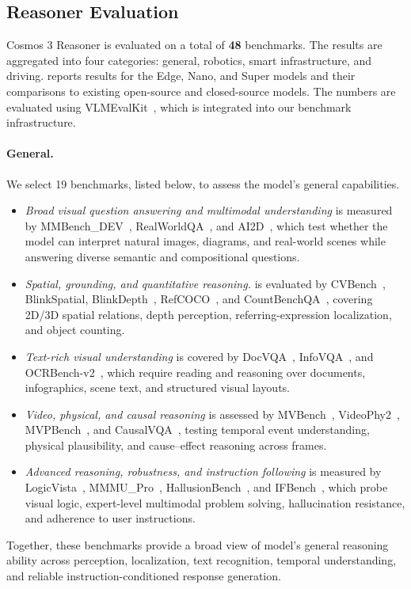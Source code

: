 \subsection{Reasoner Evaluation}



Cosmos 3 Reasoner is evaluated on a total of \textbf{48} benchmarks. The results are aggregated into four categories: general, robotics, smart infrastructure, and driving.  reports results for the Edge, Nano, and Super models and their comparisons to existing open-source and closed-source models. The numbers are evaluated using VLMEvalKit~\cite{duan2024vlmevalkit}, which is integrated into our benchmark infrastructure.

\paragraph{General.} We select 19 benchmarks, listed below, to assess the model's general capabilities.
\begin{itemize}
  \item \textit{Broad visual question answering and multimodal understanding} is measured by MMBench\_DEV~\citep{liu2024mmbench}, RealWorldQA~\citep{xai2024realworldqa}, and AI2D~\citep{kembhavi2016ai2d}, which test whether the model can interpret natural images, diagrams, and real-world scenes while answering diverse semantic and compositional questions.
  \item \textit{Spatial, grounding, and quantitative reasoning.} is evaluated by CVBench~\citep{tong2024cambrian}, BlinkSpatial, BlinkDepth~\citep{fu2024blink}, RefCOCO~\citep{yu2016refcoco}, and CountBenchQA~\citep{paiss2023countbench}, covering 2D/3D spatial relations, depth perception,
  referring-expression localization, and object counting.
  \item \textit{Text-rich visual understanding} is covered by DocVQA~\citep{mathew2021docvqa}, InfoVQA~\citep{mathew2022infographicvqa}, and OCRBench-v2~\citep{fu2026ocrbench}, which require reading and reasoning over documents, infographics, scene text, and structured
  visual layouts.
  \item \textit{Video, physical, and causal reasoning} is assessed by MVBench~\citep{li2024mvbench}, VideoPhy2~\citep{bansal2025videophy}, MVPBench~\citep{krojer2025shortcut}, and CausalVQA~\citep{foss2025causalvqa}, testing temporal event understanding, physical plausibility, and cause--effect
  reasoning across frames.
  \item \textit{Advanced reasoning, robustness, and instruction following} is measured by LogicVista~\citep{xiao2024logicvista}, MMMU\_Pro~\citep{yue2024mmmupro}, HallusionBench~\citep{guan2024hallusionbench}, and IFBench~\citep{pyatkin2025ifbench}, which probe visual logic, expert-level multimodal problem solving, hallucination resistance, and adherence to user instructions.
\end{itemize}
Together, these benchmarks provide a broad view of model's general reasoning ability across perception, localization, text recognition, temporal understanding, and reliable instruction-conditioned response generation.

